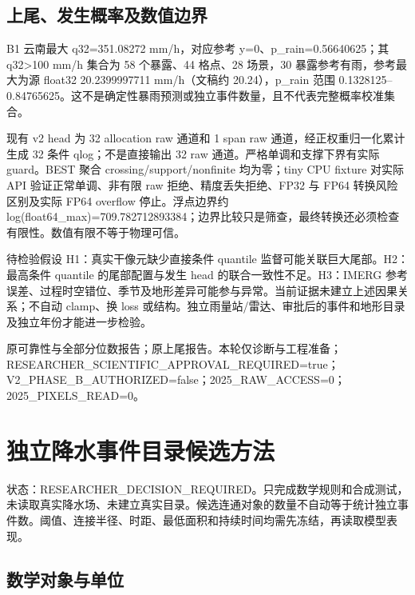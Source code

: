 \documentclass[UTF8,a4paper,10pt,fontset=fandol]{ctexart}
\begin{document}
\subsection*{上尾、发生概率及数值边界}

B1 云南最大 q32=351.08272 mm/h，对应参考 y=0、p\_\allowbreak{}rain=0.56640625；其 q32>100 mm/h 集合为 58 个暴露、44 格点、28 场景，30 暴露参考有雨，参考最大为源 float32 20.2399997711 mm/h（文稿约 20.24），p\_\allowbreak{}rain 范围 0.1328125–0.84765625。这不是确定性暴雨预测或独立事件数量，且不代表完整概率校准集合。\par

现有 v2 head 为 32 allocation raw 通道和 1 span raw 通道，经正权重归一化累计生成 32 条件 qlog；不是直接输出 32 raw 通道。严格单调和支撑下界有实际 guard。BEST 聚合 crossing/support/nonfinite 均为零；tiny CPU fixture 对实际 API 验证正常单调、非有限 raw 拒绝、精度丢失拒绝、FP32 与 FP64 转换风险区别及实际 FP64 overflow 停止。浮点边界约 log(float64\_\allowbreak{}max)=709.782712893384；边界比较只是筛查，最终转换还必须检查有限性。数值有限不等于物理可信。\par

待检验假设 H1：真实干像元缺少直接条件 quantile 监督可能关联巨大尾部。H2：最高条件 quantile 的尾部配置与发生 head 的联合一致性不足。H3：IMERG 参考误差、过程时空错位、季节及地形差异可能参与异常。当前证据未建立上述因果关系；不自动 clamp、换 loss 或结构。独立雨量站/雷达、审批后的事件和地形目录及独立年份才能进一步检验。\par

原可靠性与全部分位数报告；原上尾报告。本轮仅诊断与工程准备；RESEARCHER\_\allowbreak{}SCIENTIFIC\_\allowbreak{}APPROVAL\_\allowbreak{}REQUIRED=true；V2\_\allowbreak{}PHASE\_\allowbreak{}B\_\allowbreak{}AUTHORIZED=false；2025\_\allowbreak{}RAW\_\allowbreak{}ACCESS=0；2025\_\allowbreak{}PIXELS\_\allowbreak{}READ=0。\par

\clearpage
\section*{独立降水事件目录候选方法}

状态：RESEARCHER\_\allowbreak{}DECISION\_\allowbreak{}REQUIRED。只完成数学规则和合成测试，未读取真实降水场、未建立真实目录。候选连通对象的数量不自动等于统计独立事件数。阈值、连接半径、时距、最低面积和持续时间均需先冻结，再读取模型表现。\par

\subsection*{数学对象与单位}
\end{document}
